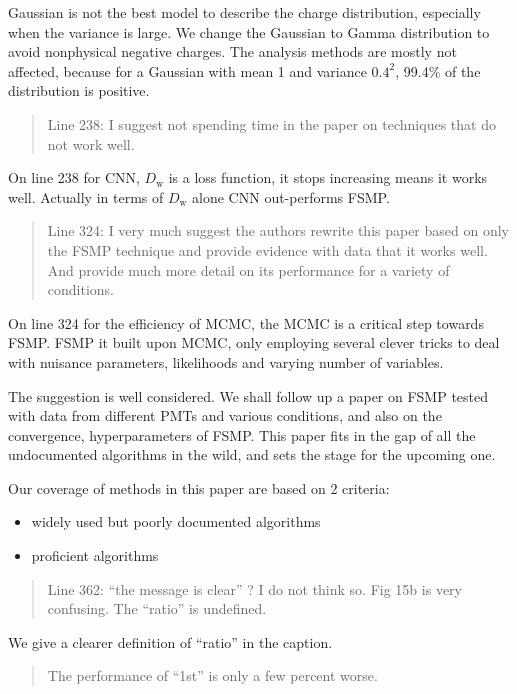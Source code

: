 \documentclass[12pt]{article}
\begin{document}
Gaussian is not the best model to describe the charge distribution, especially when the variance is large. We change the Gaussian to Gamma distribution to avoid nonphysical negative charges. The analysis methods are mostly not affected, because for a Gaussian with mean 1 and variance $0.4^2$, 99.4\% of the distribution is positive.

\begin{quote}
Line 238: I suggest not spending time in the paper on techniques that do not work well.
\end{quote}

On line 238 for CNN, $D_\mathrm{w}$ is a loss function, it stops increasing means it works well.  Actually in terms of $D_\mathrm{w}$ alone CNN out-performs FSMP.

\begin{quote}
Line 324: I very much suggest the authors rewrite this paper based on only the FSMP technique and provide evidence with data that it works well. And provide much more detail on its performance for a variety of conditions.
\end{quote}

On line 324 for the efficiency of MCMC, the MCMC is a critical step towards FSMP.  FSMP it built upon MCMC, only employing several clever tricks to deal with nuisance parameters, likelihoods and varying number
of variables.

The suggestion is well considered.  We shall follow up a paper on FSMP tested with data from different PMTs and various conditions, and also on the convergence, hyperparameters of FSMP.  This paper fits in the gap of all the undocumented algorithms in the wild, and sets the stage for the upcoming one.

Our coverage of methods in this paper are based on 2 criteria:

\begin{itemize}
    \item widely used but poorly documented algorithms
    \item proficient algorithms
\end{itemize}

\begin{quote}
Line 362: ``the message is clear'' ? I do not think so. Fig 15b is very confusing. The ``ratio'' is undefined. 
\end{quote}

We give a clearer definition of ``ratio'' in the caption.

\begin{quote}
The performance of ``1st'' is only a few percent worse. 
\end{quote}
\end{document}
